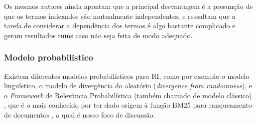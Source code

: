         Os mesmos autores ainda apontam que a principal desvantagem é a presunção de que os termos indexados são mutualmente independentes, e ressaltam que a tarefa de considerar a dependência dos termos é algo bastante complicado e geram resultados ruins caso não seja feita de modo adequado.
    
    \subsubsection{Modelo probabilístico}  \label{subsubsec:Modelo-probabilístico}
        Existem diferentes modelos probabilísticos para RI, como por exemplo o modelo linguístico, o modelo de divergência do aleatório (\textit{divergence from randomness}), e o \textit{Framework} de Relevância Probabilística (também chamado de modelo clássico) \cite[p.~87]{Zhai2016TDMA}, que é o mais conhecido por ter dado origem à função BM25\footnotemark{} para ranqueamento de documentos \cite[p.~334--335]{robertson_probabilistic_2010} \cite[p.~111]{Zhai2016TDMA}, a qual é nosso foco de discussão.
        
        
